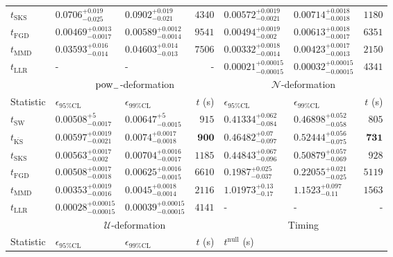 \begin{tabular}{l|llr|llr}
	$t_{\mathrm{SKS}}$ & $0.0706_{-0.025}^{+0.019}$ & $0.0902_{-0.021}^{+0.019}$ & $4340$ & $0.00572_{-0.0021}^{+0.0019}$ & $0.00714_{-0.0018}^{+0.0018}$ & $1180$ \\
	$t_{\mathrm{FGD}}$ & ${\mathbf{0.00469_{-0.0017}^{+0.0013}}}$ & ${\mathbf{0.00589_{-0.0014}^{+0.0012}}}$ & $9541$ & $0.00494_{-0.002}^{+0.0019}$ & $0.00613_{-0.0017}^{+0.0018}$ & $6351$ \\
	$t_{\mathrm{MMD}}$ & $0.03593_{-0.014}^{+0.016}$ & $0.04603_{-0.013}^{+0.014}$ & $7506$ & ${\mathbf{0.00332_{-0.0014}^{+0.0018}}}$ & ${\mathbf{0.00423_{-0.0013}^{+0.0017}}}$ & $2150$ \\
	$t_{\mathrm{LLR}}$ & - & - & - & $0.00021_{-0.00015}^{+0.00015}$ & $0.00032_{-0.00015}^{+0.00015}$ & $4341$ \\
	\toprule
	\multicolumn{1}{c}{} & \multicolumn{3}{c}{$\rm{pow}_{-}$-deformation} & \multicolumn{3}{c}{$\mathcal{N}$-deformation} \\
	Statistic & $\epsilon_{95\%\mathrm{CL}}$ & $\epsilon_{99\%\mathrm{CL}}$ & $t$ (s) & $\epsilon_{95\%\mathrm{CL}}$ & $\epsilon_{99\%\mathrm{CL}}$ & $t$ (s) \\
	\midrule
	$t_{\mathrm{SW}}$ & $0.00508_{-0.0017}^{+5}$ & $0.00647_{-0.0015}^{+5}$ & $915$ & $0.41334_{-0.084}^{+0.062}$ & $0.46898_{-0.058}^{+0.052}$ & $805$ \\
	$t_{\overline{\mathrm{KS}}}$ & $0.00597_{-0.0021}^{+0.0019}$ & $0.0074_{-0.0018}^{+0.0017}$ & ${\mathbf{900}}$ & $0.46482_{-0.097}^{+0.07}$ & $0.52444_{-0.075}^{+0.056}$ & ${\mathbf{731}}$ \\
	$t_{\mathrm{SKS}}$ & $0.00563_{-0.002}^{+0.0017}$ & $0.00704_{-0.0017}^{+0.0016}$ & $1185$ & $0.44843_{-0.096}^{+0.067}$ & $0.50879_{-0.069}^{+0.057}$ & $928$ \\
	$t_{\mathrm{FGD}}$ & $0.00508_{-0.0018}^{+0.0017}$ & $0.00625_{-0.0015}^{+0.0016}$ & $6610$ & ${\mathbf{0.1987_{-0.037}^{+0.025}}}$ & ${\mathbf{0.22055_{-0.025}^{+0.021}}}$ & $5119$ \\
	$t_{\mathrm{MMD}}$ & ${\mathbf{0.00353_{-0.0016}^{+0.0019}}}$ & ${\mathbf{0.0045_{-0.0014}^{+0.0018}}}$ & $2116$ & $1.01973_{-0.17}^{+0.13}$ & $1.1523_{-0.11}^{+0.097}$ & $1563$ \\
	$t_{\mathrm{LLR}}$ & $0.00028_{-0.00015}^{+0.00015}$ & $0.00039_{-0.00015}^{+0.00015}$ & $4141$ & - & - & - \\
	\toprule
	\multicolumn{1}{c}{} & \multicolumn{3}{c}{$\mathcal{U}$-deformation} & \multicolumn{3}{c}{Timing} \\
	Statistic & $\epsilon_{95\%\mathrm{CL}}$ & $\epsilon_{99\%\mathrm{CL}}$ & $t$ (s) & $t^{\mathrm{null}}$ (s) \\

\end{tabular}
